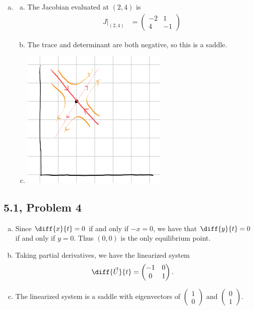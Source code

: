 \documentclass[10pt]{mypackage}
\begin{document}
\begin{enumerate}[(a)]
  \item 
    \begin{enumerate}[(a)]
      \item The Jacobian evaluated at $\left(2,4\right)$ is
        \begin{align*}
          J|_{\left(2,4\right)} &= \begin{pmatrix}-2 & 1 \\ 4 & -1\end{pmatrix}
        \end{align*}
      \item The trace and determinant are both negative, so this is a saddle.
      \item 
        \begin{center}
          \includegraphics[width=7cm]{images/5_1_3c2.png}
        \end{center}
    \end{enumerate}
\end{enumerate}
\subsection{5.1, Problem 4}%
\begin{enumerate}[(a)]
  \item Since $\diff{x}{t} = 0$ if and only if $-x = 0$, we have that $\diff{y}{t} = 0$ if and only if $y = 0$. Thus $\left(0,0\right)$ is the only equilibrium point.
  \item Taking partial derivatives, we have the linearized system
    \begin{align*}
      \diff{\vec{U}}{t} &= \begin{pmatrix}-1 & 0 \\ 0 & 1\end{pmatrix}.
    \end{align*}
  \item The linearized system is a saddle with eigenvectors of $ \begin{pmatrix}1\\0\end{pmatrix} $ and $ \begin{pmatrix}0\\1\end{pmatrix} $.
\end{enumerate}
\end{document}
